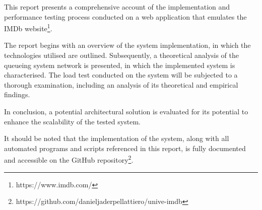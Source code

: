 This report presents a comprehensive account of the implementation and performance testing process conducted on a web application that emulates the IMDb website\footnote[1]{https://www.imdb.com/}.

The report begins with an overview of the system implementation, in which the technologies utilised are outlined. Subsequently, a theoretical analysis of the queueing system network is presented, in which the implemented system is characterised.
The load test conducted on the system will be subjected to a thorough examination, including an analysis of its theoretical and empirical findings.

In conclusion, a potential architectural solution is evaluated for its potential to enhance the scalability of the tested system.

It should be noted that the implementation of the system, along with all automated programs and scripts referenced in this report, is fully documented and accessible on the GitHub repository\footnote[2]{https://github.com/danieljaderpellattiero/unive-imdb}.
